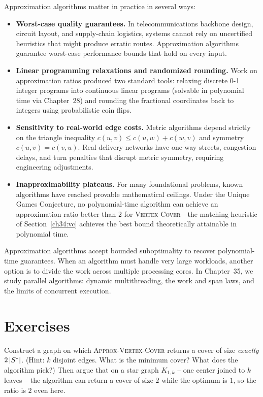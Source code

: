 Approximation algorithms matter in practice in several ways:
\begin{itemize}
  \item \textbf{Worst-case quality guarantees.} In
        telecommunications backbone design, circuit layout, and supply-chain
        logistics, systems cannot rely on uncertified heuristics that might
        produce erratic routes. Approximation algorithms guarantee worst-case
        performance bounds that hold on every input.
  \item \textbf{Linear programming relaxations and randomized rounding.} Work
        on approximation ratios produced two standard tools:
        relaxing discrete 0-1 integer programs into continuous linear programs
        (solvable in polynomial time via Chapter~28) and rounding
        the fractional coordinates back to integers using probabilistic coin
        flips.
  \item \textbf{Sensitivity to real-world edge costs.} Metric algorithms depend
        strictly on the triangle inequality $c(u,v) \le c(u,w) + c(w,v)$ and
        symmetry $c(u,v) = c(v,u)$. Real delivery networks have one-way streets,
        congestion delays, and turn penalties that disrupt metric symmetry,
        requiring engineering adjustments.
  \item \textbf{Inapproximability plateaus.} For many foundational problems,
        known algorithms have reached provable mathematical ceilings. Under the
        Unique Games Conjecture, no polynomial-time algorithm can achieve an
        approximation ratio better than $2$ for \textsc{Vertex-Cover}---the
        matching heuristic of Section~\ref{ch34:vc} achieves the best bound
        theoretically attainable in polynomial time.
\end{itemize}

Approximation algorithms accept bounded suboptimality to recover polynomial-time guarantees. When an algorithm must handle very large workloads, another option is to divide the work across multiple processing cores. In Chapter~35, we study parallel algorithms: dynamic multithreading, the work and span laws, and the limits of concurrent execution.

\section{Exercises}

\begin{exercise}
\label{ch34:ex-vc-tight}
Construct a graph on which \textsc{Approx-Vertex-Cover} returns a cover of
size \emph{exactly} $2\,\lvert S^{*}\rvert$. (Hint: $k$ disjoint edges. What is the
minimum cover? What does the algorithm pick?) Then argue that on a star graph
$K_{1,k}$ -- one center joined to $k$ leaves -- the algorithm can return a
cover of size $2$ while the optimum is $1$, so the ratio is $2$ even here.
\end{exercise}

